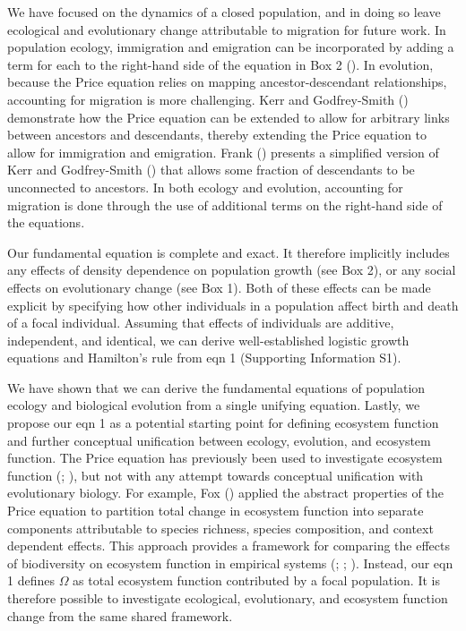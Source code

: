 \documentclass[
]{article}
\begin{document}
We have focused on the dynamics of a closed population, and in doing so
leave ecological and evolutionary change attributable to migration for
future work. In population ecology, immigration and emigration can be
incorporated by adding a term for each to the right-hand side of the
equation in Box 2 (). In
evolution, because the Price equation relies on mapping
ancestor-descendant relationships, accounting for migration is more
challenging. Kerr and Godfrey-Smith ()
demonstrate how the Price equation can be extended to allow for
arbitrary links between ancestors and descendants, thereby extending the
Price equation to allow for immigration and emigration. Frank
() presents a simplified version of Kerr
and Godfrey-Smith () that allows some
fraction of descendants to be unconnected to ancestors. In both ecology
and evolution, accounting for migration is done through the use of
additional terms on the right-hand side of the equations.

Our fundamental equation is complete and exact. It therefore implicitly
includes any effects of density dependence on population growth (see Box
2), or any social effects on evolutionary change (see Box 1). Both of
these effects can be made explicit by specifying how other individuals
in a population affect birth and death of a focal individual. Assuming
that effects of individuals are additive, independent, and identical, we
can derive well-established logistic growth equations and Hamilton's
rule from eqn 1 (Supporting Information S1).

We have shown that we can derive the fundamental equations of population
ecology and biological evolution from a single unifying equation.
Lastly, we propose our eqn 1 as a potential starting point for defining
ecosystem function and further conceptual unification between ecology,
evolution, and ecosystem function. The Price equation has previously
been used to investigate ecosystem function
(;
), but not with any attempt towards
conceptual unification with evolutionary biology. For example, Fox
() applied the abstract properties of the
Price equation to partition total change in ecosystem function into
separate components attributable to species richness, species
composition, and context dependent effects. This approach provides a
framework for comparing the effects of biodiversity on ecosystem
function in empirical systems (;
;
). Instead, our
eqn 1 defines \(\Omega\) as total ecosystem function contributed by a
focal population. It is therefore possible to investigate ecological,
evolutionary, and ecosystem function change from the same shared
framework.
\end{document}
